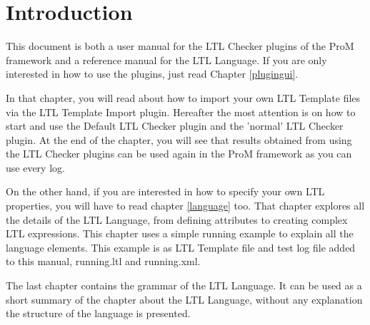 \chapter[Introduction]{Introduction}
\label{introduction}

This document is both a user manual for the LTL Checker plugins of the ProM
framework and a reference manual for the LTL Language. If you are only
interested in how to use the plugins, just read Chapter \ref{plugingui}. 

In that chapter, you will read about how to import your own LTL Template files
via the LTL Template Import plugin. Hereafter the most attention is on how to
start and use the Default LTL Checker plugin and the 'normal' LTL Checker
plugin. At the end of the chapter, you will see that results obtained from
using the LTL Checker plugins can be used again in the ProM framework as you
can use every log.

On the other hand, if you are interested in how to specify your own LTL
properties, you will have to read chapter \ref{language} too. That chapter
explores all the details of the LTL Language, from defining attributes to
creating complex LTL expressions. This chapter uses a simple running example
to explain all the language elements. This example is as LTL Template file and
test log file added to this manual, running.ltl and running.xml.

The last chapter contains the grammar of the LTL Language. It can be used as a
short summary of the chapter about the LTL Language, without any explanation the
structure of the language is presented.
